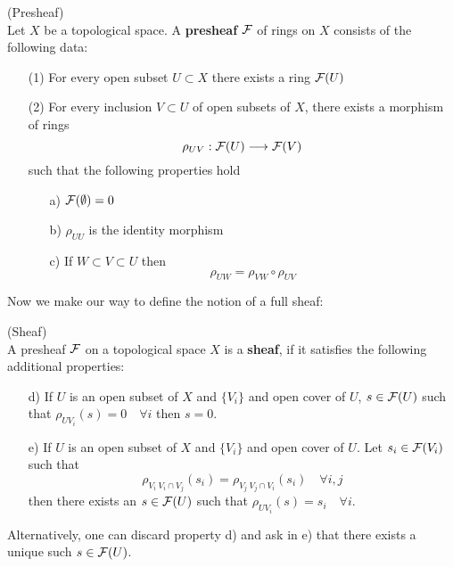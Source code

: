 \begin{definition} (Presheaf)\\
  Let $X$ be a topological space. A \textbf{presheaf} ${\mathcal{F}}$ of rings on $X$ consists of the following data:
  \begin{itemize}
    \item[(1)] For every open subset $U\subset X$ there exists a ring ${\mathcal{F}}(U)$

    \item[(2)] For every inclusion $V \subset U$ of open subsets of $X$, there exists a morphism of rings
    $$ \rho_{UV} : {\mathcal{F}}(U) \longrightarrow {\mathcal{F}}(V) $$
    such that the following properties hold
    \begin{itemize}
      \item[a)] ${\mathcal{F}}(\emptyset) = 0$

      \item[b)] $\rho_{UU}$ is the identity morphism

      \item[c)] If $W\subset V \subset U$ then
      $$ \rho_{UW} = \rho_{VW} \circ \rho_{UV} $$

    \end{itemize}
  \end{itemize}
\end{definition}

Now we make our way to define the notion of a full sheaf:

\begin{definition} (Sheaf)\\
  A presheaf ${\mathcal{F}}$ on a topological space $X$ is a \textbf{sheaf}, if it satisfies the following additional properties:
  \begin{itemize}
    \item[d)] If $U$ is an open subset of $X$ and $\{V_i\}$ and open cover of $U$, $s\in{\mathcal{F}}(U)$ such that $\rho_{UV_i}(s) = 0 \quad \forall i$ then $s=0$.

    \item[e)] If $U$ is an open subset of $X$ and $\{V_i\}$ and open cover of $U$. Let $s_i \in {\mathcal{F}}(V_i)$ such that
    \begin{equation}
      \rho_{V_i \ V_i \cap V_j} (s_i) = \rho_{V_j \ V_j \cap V_i} (s_i) \quad \forall i,j
    \end{equation}
    then there exists an $s\in{\mathcal{F}}(U)$ such that $\rho_{U V_i} (s) = s_i \quad \forall i$.
  \end{itemize}
  Alternatively, one can discard property d) and ask in e) that there exists a unique such $s\in{\mathcal{F}}(U)$.
\end{definition}

